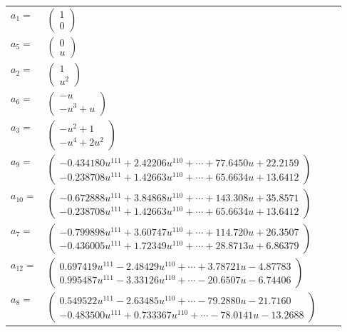 \documentclass[1p]{elsarticle_modified}
\theoremstyle{definition}
\begin{document}
\begin{tabular}{m{7pt} m{180pt} m{7pt} m{180pt} }
\flushright $a_{1}=$&$\begin{pmatrix}1\\0\end{pmatrix}$ \\
\flushright $a_{5}=$&$\begin{pmatrix}0\\u\end{pmatrix}$ \\
\flushright $a_{2}=$&$\begin{pmatrix}1\\u^2\end{pmatrix}$ \\
\flushright $a_{6}=$&$\begin{pmatrix}- u\\- u^3+u\end{pmatrix}$ \\
\flushright $a_{3}=$&$\begin{pmatrix}- u^2+1\\- u^4+2 u^2\end{pmatrix}$ \\
\flushright $a_{9}=$&$\begin{pmatrix}-0.434180 u^{111}+2.42206 u^{110}+\cdots+77.6450 u+22.2159\\-0.238708 u^{111}+1.42663 u^{110}+\cdots+65.6634 u+13.6412\end{pmatrix}$ \\
\flushright $a_{10}=$&$\begin{pmatrix}-0.672888 u^{111}+3.84868 u^{110}+\cdots+143.308 u+35.8571\\-0.238708 u^{111}+1.42663 u^{110}+\cdots+65.6634 u+13.6412\end{pmatrix}$ \\
\flushright $a_{7}=$&$\begin{pmatrix}-0.799898 u^{111}+3.60747 u^{110}+\cdots+114.720 u+26.3507\\-0.436005 u^{111}+1.72349 u^{110}+\cdots+28.8713 u+6.86379\end{pmatrix}$ \\
\flushright $a_{12}=$&$\begin{pmatrix}0.697419 u^{111}-2.48429 u^{110}+\cdots+3.78721 u-4.87783\\0.995487 u^{111}-3.33126 u^{110}+\cdots-20.6507 u-6.74406\end{pmatrix}$ \\
\flushright $a_{8}=$&$\begin{pmatrix}0.549522 u^{111}-2.63485 u^{110}+\cdots-79.2880 u-21.7160\\-0.483500 u^{111}+0.733367 u^{110}+\cdots-78.0141 u-13.2688\end{pmatrix}$ \\

\end{tabular}
\end{document}
